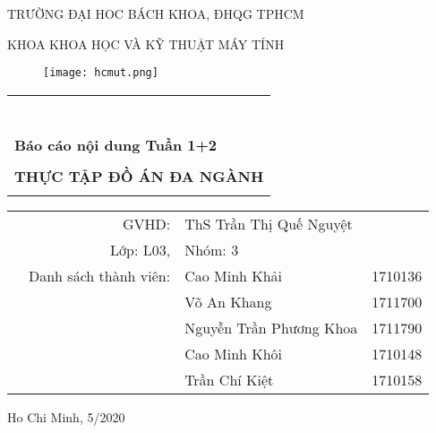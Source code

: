 \documentclass[a4paper]{article}
\begin{document}
\begin{titlepage}

\begin{center}
TRƯỜNG ĐẠI HOC BÁCH KHOA, ĐHQG TPHCM

KHOA KHOA HỌC VÀ KỸ THUẬT MÁY TÍNH
\end{center}

\vspace{1cm}

\begin{figure}[h!]
\begin{center}
\texttt{[image: hcmut.png]}
\end{center}
\end{figure}

\vspace{1cm}


\begin{center}
\begin{tabular}{c}
\multicolumn{1}{l}{\textbf{{}}}\\
~~\\
\hline
\\
\multicolumn{1}{l}{\textbf{{\Large Báo cáo nội dung Tuần 1+2}}}\\
\\
\textbf{\Huge THỰC TẬP ĐỒ ÁN ĐA NGÀNH}\\
\\
\hline
\end{tabular}
\end{center}

\vspace{3cm}

\begin{table}[h]
\begin{tabular}{rrlr}

\hspace{4 cm} & GVHD: & ThS Trần Thị Quế Nguyệt \\
& Lớp: L03, & Nhóm: 3 \\
& Danh sách thành viên: & Cao Minh Khải & 1710136 \\
& & Võ An Khang & 1711700 \\
& & Nguyễn Trần Phương Khoa & 1711790 \\
& & Cao Minh Khôi & 1710148 \\
& & Trần Chí Kiệt & 1710158 \\


\end{tabular}
\end{table}

\begin{center}
{\footnotesize Ho Chi Minh, 5/2020}
\end{center}
\end{titlepage}
\end{document}

